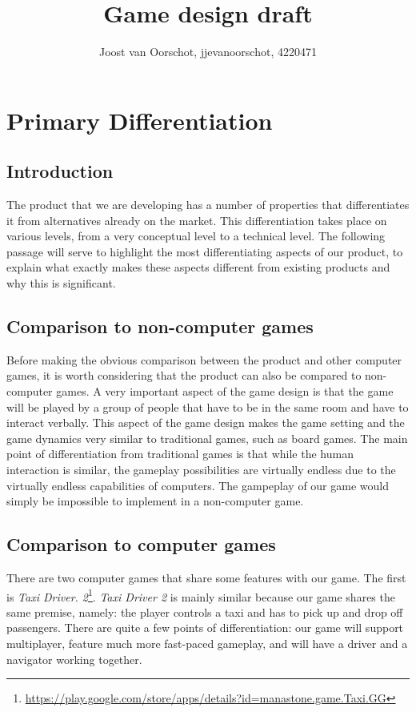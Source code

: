 \documentclass[11pt,twoside,a4paper]{article}
\title{Game design draft}
\author{
        Joost van Oorschot, jjevanoorschot, 4220471
}
\begin{document}
\maketitle
\section*{Primary Differentiation}
\subsection*{Introduction}
The product that we are developing has a number of properties that differentiates it from alternatives already on the market. This differentiation takes place on various levels, from a very conceptual level to a technical level. The following passage will serve to highlight the most differentiating aspects of our product, to explain what exactly makes these aspects different from existing products and why this is significant.

\subsection*{Comparison to non-computer games}
Before making the obvious comparison between the product and other computer games, it is worth considering that the product can also be compared to non-computer games. A very important aspect of the game design is that the game will be played by a group of people that have to be in the same room and have to interact verbally. This aspect of the game design makes the game setting and the game dynamics very similar to traditional games, such as board games. The main point of differentiation from traditional games is that while the human interaction is similar, the gameplay possibilities are virtually endless due to the virtually endless capabilities of computers. The gampeplay of our game would simply be impossible to implement in a non-computer game.

\subsection*{Comparison to computer games}
There are two computer games that share some features with our game. The first is \emph{Taxi Driver.  2}\footnote{\url{https://play.google.com/store/apps/details?id=manastone.game.Taxi.GG}}. \emph{Taxi Driver 2} is mainly similar because our game shares the same premise, namely: the player controls a taxi and has to pick up and drop off passengers. There are quite a few points of differentiation: our game will support multiplayer, feature much more fast-paced gameplay, and will have a driver and a navigator working together.
\end{document}
